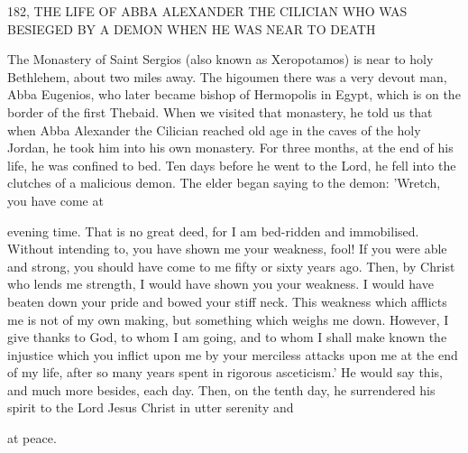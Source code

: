 182, THE LIFE OF ABBA ALEXANDER
THE CILICIAN WHO WAS BESIEGED
BY A DEMON WHEN HE WAS NEAR TO DEATH

The Monastery of Saint Sergios (also known as Xeropotamos) is
near to holy Bethlehem, about two miles away.
The higoumen there
was a very devout man, Abba Eugenios, who later became bishop
of Hermopolis in Egypt, which is on the border of the first Thebaid.
When we visited that monastery, he told us that when Abba
Alexander the Cilician reached old age in the caves of the holy
Jordan, he took him into his own monastery.
For three months, at
the end of his life, he was confined to bed.
Ten days before he went
to the Lord, he fell into the clutches of a malicious demon.
The
elder began saying to the demon: 'Wretch, you have come at

evening time.
That is no great deed, for I am bed-ridden and
immobilised.
Without intending to, you have shown me your
weakness, fool! If you were able and strong, you should have come
to me fifty or sixty years ago.
Then, by Christ who lends me
strength, I would have shown you your weakness.
I would have
beaten down your pride and bowed your stiff neck.
This weakness
which afflicts me is not of my own making, but something which
weighs me down.
However, I give thanks to God, to whom I am
going, and to whom I shall make known the injustice which you
inflict upon me by your merciless attacks upon me at the end of my
life, after so many years spent in rigorous asceticism.' He would say
this, and much more besides, each day.
Then, on the tenth day, he
surrendered his spirit to the Lord Jesus Christ in utter serenity and

at peace.

